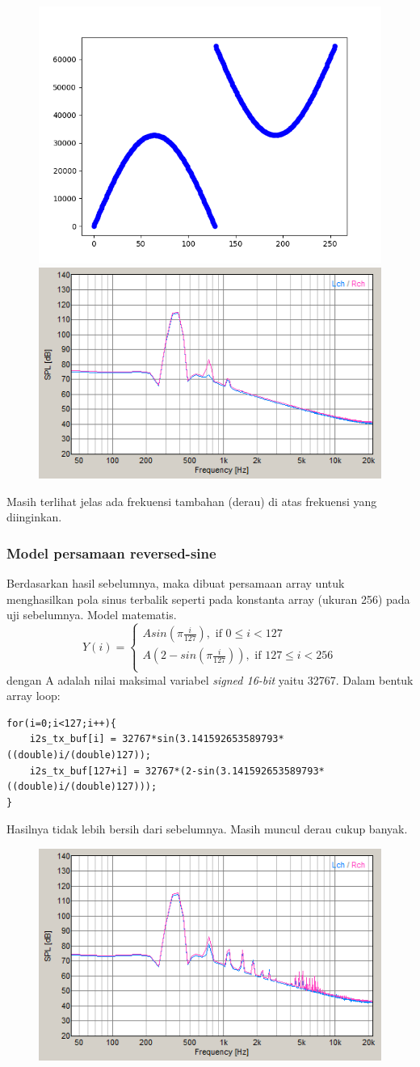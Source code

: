 \documentclass[12pt,]{article}
\begin{document}
	\begin{figure}[H]
		\centering
		\includegraphics[width=0.45\linewidth]{result/day_1/rev_sine_table}
		\includegraphics[width=0.45\linewidth]{result/day_1/tableMax256}
	\end{figure}

	Masih terlihat jelas ada frekuensi tambahan (derau) di atas frekuensi yang diinginkan.

	\subsubsection{Model persamaan reversed-sine}
	Berdasarkan hasil sebelumnya, maka dibuat persamaan array untuk menghasilkan pola sinus terbalik
	seperti pada konstanta array (ukuran 256) pada uji sebelumnya.
	Model matematis.
	\[
	Y(i) =
	\begin{cases}
	A sin(\pi \frac{i}{127}), \text{ if } 0 \leq i < 127\\
	A(2-sin(\pi \frac{i}{127})), \text{ if } 127 \leq i < 256\\
	\end{cases}
	 \]
	 dengan A adalah nilai maksimal variabel \textit{signed 16-bit} yaitu 32767.
	 Dalam bentuk array loop:
	 \begin{verbatim}
for(i=0;i<127;i++){
	i2s_tx_buf[i] = 32767*sin(3.141592653589793*((double)i/(double)127));
	i2s_tx_buf[127+i] = 32767*(2-sin(3.141592653589793*((double)i/(double)127)));
}
	 \end{verbatim}
	 Hasilnya tidak lebih bersih dari sebelumnya. Masih muncul derau cukup banyak.
	 \begin{figure}[H]
	 	\centering
	 	\includegraphics[width=0.45\linewidth]{result/day_1/halfMax256}
	 \end{figure}
\end{document}
